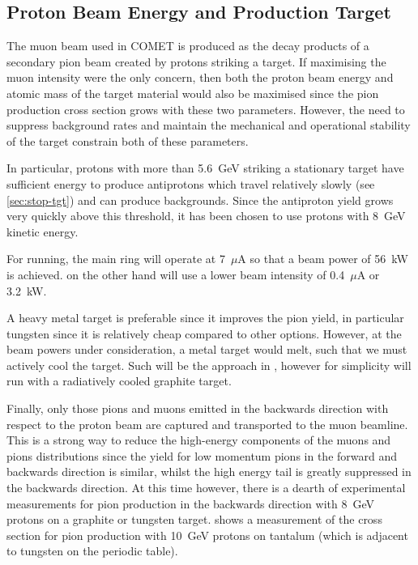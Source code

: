 \subsection{Proton Beam Energy and Production Target}
The muon beam used in COMET is produced as the decay products of a secondary pion beam created by protons striking a target.
If maximising the muon intensity were the only concern, then both the proton beam energy and atomic mass of the target material would also be maximised since the pion production cross section
grows with these two parameters.
However, the need to suppress background rates and maintain the mechanical and operational stability of the target constrain both of these parameters.

In particular, protons with more than 5.6~GeV  striking a stationary target have sufficient energy to produce antiprotons which travel relatively slowly (see \ref{sec:stop-tgt}) and can produce backgrounds.
Since the antiproton yield grows very quickly above this threshold, it has been chosen to use protons with 8~GeV kinetic energy.

For \phaseII running, the main ring will operate at 7~$\mu$A so that a beam power of 56~kW is achieved.  
\phaseI on the other hand will use a lower beam intensity of 0.4~$\mu$A or 3.2~kW.

A heavy metal target is preferable since it improves the pion yield, in particular tungsten since it is relatively cheap compared to other options.
However, at the beam powers under consideration, a metal target would melt, such that we must actively cool the target.
Such will be the approach in \phaseII, however for simplicity \phaseI will run with a radiatively cooled graphite target.


Finally, only those pions and muons emitted in the backwards direction with respect to the proton beam are captured and transported to the muon beamline.
This is a strong way to reduce the high-energy components of the muons and pions distributions since the yield for low momentum pions in the forward and backwards direction is similar, whilst the high energy tail is greatly suppressed in the backwards direction.
At this time however, there is a dearth of experimental measurements for pion production in the backwards direction with 8~GeV protons on a graphite or tungsten target.
 shows a measurement of the cross section for pion production with 10~GeV protons on tantalum (which is adjacent to tungsten on the periodic table).

